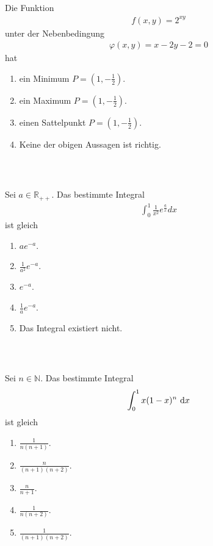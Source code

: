 \subsection*{}
Die Funktion
\begin{align*}
	f(x,y) = 2^{xy}
\end{align*}
unter der Nebenbedingung
\begin{align*}
	\varphi(x,y)
	=
	x - 2 y - 2
	= 
	0
\end{align*}
hat
\renewcommand{\labelenumi}{(\alph{enumi})}
\begin{enumerate}
\item 
ein Minimum $ P = \left(1,-\frac{1}{2} \right) $.
\item
ein Maximum $ P = \left(1,-\frac{1}{2} \right) $.
\item
einen Sattelpunkt $ P = \left(1,-\frac{1}{2} \right) $.
\item 
Keine der obigen Aussagen ist richtig.
\end{enumerate}
\ \\
\subsection*{}
Sei $ a \in \mathbb{R}_{++} $. Das bestimmte Integral
\begin{align*}
	\int_0^1
	\frac{1}{x^2} e^{\frac{a}{x}} dx
\end{align*}
ist gleich
\renewcommand{\labelenumi}{(\alph{enumi})}
\begin{enumerate}
	\item 
	$a e^{-a} $.
	\item
	$\frac{1}{a^2} e^{-a}$.
	\item
	$e^{-a} $.
	\item
	$\frac{1}{a} e^{-a}$.	
	\item
	Das Integral existiert nicht.
\end{enumerate}
\ \\
\subsection*{}
Sei $ n \in \mathbb{N} $.
Das bestimmte Integral
\begin{align*}
	\int_0^1
	x(1-x)^n
	\ \text{\rmfamily d} x
\end{align*}
ist gleich
\renewcommand{\labelenumi}{(\alph{enumi})}
\begin{enumerate}
	\item 
	$\frac{1}{n(n+1)}$.
	\item
	$\frac{n}{(n+1)(n+2)}$.
	\item
	$\frac{n}{n+1}$.
	\item
	$\frac{1}{n(n+2)}$.
	\item
	$\frac{1}{(n+1)(n+2)}$.	
\end{enumerate}
\ \\
